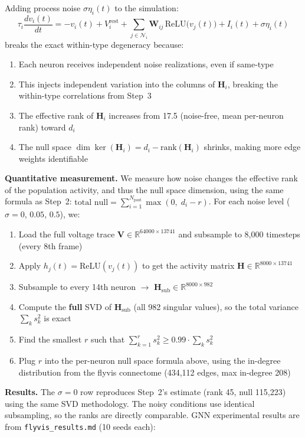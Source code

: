 \documentclass[11pt,a4paper]{article}
\begin{document}
Adding process noise $\sigma\eta_i(t)$ to the simulation:
\begin{equation}
\tau_i\frac{dv_i(t)}{dt} = -v_i(t) + V_i^{\text{rest}}
+ \sum_{j\in\mathcal{N}_i} \mathbf{W}_{ij}\,
  \text{ReLU}\!\big(v_j(t)\big)
+ I_i(t) + \sigma\eta_i(t)
\end{equation}
breaks the exact within-type degeneracy because:
\begin{enumerate}[nosep]
\item Each neuron receives independent noise realizations, even if same-type
\item This injects independent variation into the columns of $\mathbf{H}_i$, breaking the within-type correlations from Step~3
\item The effective rank of $\mathbf{H}_i$ increases from 17.5 (noise-free, mean per-neuron rank) toward $d_i$
\item The null space $\dim\ker(\mathbf{H}_i) = d_i - \text{rank}(\mathbf{H}_i)$ shrinks, making more edge weights identifiable
\end{enumerate}
\textbf{Quantitative measurement.} We measure how noise changes the effective rank of the population activity, and thus the null space dimension, using the same formula as Step~2: $\text{total null} = \sum_{i=1}^{N_{\text{post}}} \max(0, \; d_i - r)$. For each noise level ($\sigma = 0$, $0.05$, $0.5$), we:
\begin{enumerate}[nosep]
\item Load the full voltage trace $\mathbf{V} \in \mathbb{R}^{64000 \times 13741}$ and subsample to 8,000 timesteps (every 8th frame)
\item Apply $h_j(t) = \text{ReLU}(v_j(t))$ to get the activity matrix $\mathbf{H} \in \mathbb{R}^{8000 \times 13741}$
\item Subsample to every 14th neuron $\to$ $\mathbf{H}_{\text{sub}} \in \mathbb{R}^{8000 \times 982}$
\item Compute the \textbf{full} SVD of $\mathbf{H}_{\text{sub}}$ (all 982 singular values), so the total variance $\sum_k s_k^2$ is exact
\item Find the smallest $r$ such that $\sum_{k=1}^{r} s_k^2 \geq 0.99 \cdot \sum_k s_k^2$
\item Plug $r$ into the per-neuron null space formula above, using the in-degree distribution from the flyvis connectome (434,112 edges, max in-degree 208)
\end{enumerate}
\noindent\textbf{Results.} The $\sigma = 0$ row reproduces Step~2's estimate (rank 45, null 115,223) using the same SVD methodology. The noisy conditions use identical subsampling, so the ranks are directly comparable. GNN experimental results are from \texttt{flyvis\_results.md} (10 seeds each):
\end{document}
